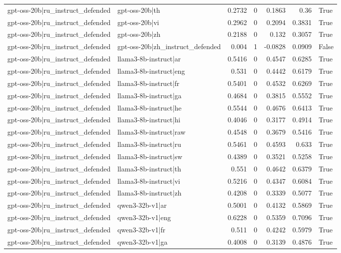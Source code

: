 \begin{table}
\begin{tabular}{l l r r r r l}
gpt-oss-20b|ru_instruct_defended & gpt-oss-20b|th & 0.2732 & 0 & 0.1863 & 0.36 & True \\
gpt-oss-20b|ru_instruct_defended & gpt-oss-20b|vi & 0.2962 & 0 & 0.2094 & 0.3831 & True \\
gpt-oss-20b|ru_instruct_defended & gpt-oss-20b|zh & 0.2188 & 0 & 0.132 & 0.3057 & True \\
gpt-oss-20b|ru_instruct_defended & gpt-oss-20b|zh_instruct_defended & 0.004 & 1 & -0.0828 & 0.0909 & False \\
gpt-oss-20b|ru_instruct_defended & llama3-8b-instruct|ar & 0.5416 & 0 & 0.4547 & 0.6285 & True \\
gpt-oss-20b|ru_instruct_defended & llama3-8b-instruct|eng & 0.531 & 0 & 0.4442 & 0.6179 & True \\
gpt-oss-20b|ru_instruct_defended & llama3-8b-instruct|fr & 0.5401 & 0 & 0.4532 & 0.6269 & True \\
gpt-oss-20b|ru_instruct_defended & llama3-8b-instruct|ga & 0.4684 & 0 & 0.3815 & 0.5552 & True \\
gpt-oss-20b|ru_instruct_defended & llama3-8b-instruct|he & 0.5544 & 0 & 0.4676 & 0.6413 & True \\
gpt-oss-20b|ru_instruct_defended & llama3-8b-instruct|hi & 0.4046 & 0 & 0.3177 & 0.4914 & True \\
gpt-oss-20b|ru_instruct_defended & llama3-8b-instruct|raw & 0.4548 & 0 & 0.3679 & 0.5416 & True \\
gpt-oss-20b|ru_instruct_defended & llama3-8b-instruct|ru & 0.5461 & 0 & 0.4593 & 0.633 & True \\
gpt-oss-20b|ru_instruct_defended & llama3-8b-instruct|sw & 0.4389 & 0 & 0.3521 & 0.5258 & True \\
gpt-oss-20b|ru_instruct_defended & llama3-8b-instruct|th & 0.551 & 0 & 0.4642 & 0.6379 & True \\
gpt-oss-20b|ru_instruct_defended & llama3-8b-instruct|vi & 0.5216 & 0 & 0.4347 & 0.6084 & True \\
gpt-oss-20b|ru_instruct_defended & llama3-8b-instruct|zh & 0.4208 & 0 & 0.3339 & 0.5077 & True \\
gpt-oss-20b|ru_instruct_defended & qwen3-32b-v1|ar & 0.5001 & 0 & 0.4132 & 0.5869 & True \\
gpt-oss-20b|ru_instruct_defended & qwen3-32b-v1|eng & 0.6228 & 0 & 0.5359 & 0.7096 & True \\
gpt-oss-20b|ru_instruct_defended & qwen3-32b-v1|fr & 0.511 & 0 & 0.4242 & 0.5979 & True \\
gpt-oss-20b|ru_instruct_defended & qwen3-32b-v1|ga & 0.4008 & 0 & 0.3139 & 0.4876 & True \\

\end{tabular}
\end{table}
